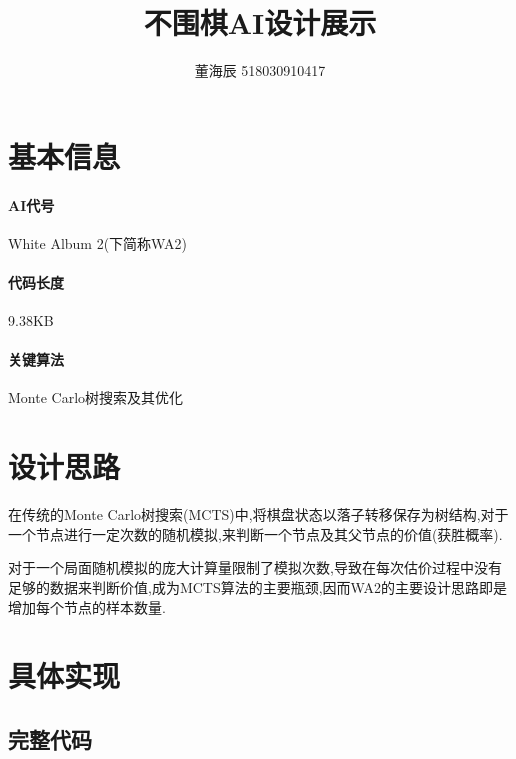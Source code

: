 \documentclass[UTF8]{article}
\title{不围棋AI设计展示}
\author{董海辰 518030910417}
\theoremstyle{definition}
\begin{document}
\maketitle

\tableofcontents
\newpage

\section{基本信息}

\paragraph{AI代号} White Album 2(下简称WA2)

\paragraph{代码长度} 9.38KB

\paragraph{关键算法} Monte Carlo树搜索及其优化

\section{设计思路}

在传统的Monte Carlo树搜索(MCTS)中,将棋盘状态以落子转移保存为树结构,对于一个节点进行一定次数的随机模拟,来判断一个节点及其父节点的价值(获胜概率).

对于一个局面随机模拟的庞大计算量限制了模拟次数,导致在每次估价过程中没有足够的数据来判断价值,成为MCTS算法的主要瓶颈,因而WA2的主要设计思路即是增加每个节点的样本数量.

\section{具体实现}

\subsection{完整代码}
\end{document}
